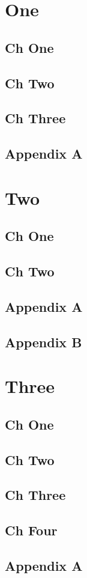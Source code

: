 \documentclass{book}
\begin{document}
    \part{One}
        \chapter{Ch One}
        \chapter{Ch Two}
        \chapter{Ch Three}
      \begin{appendices}
        \chapter{Appendix A}
      \end{appendices}
    \part{Two}
        \chapter{Ch One}
        \chapter{Ch Two}
      \begin{appendices}
        \chapter{Appendix A}
        \chapter{Appendix B}
      \end{appendices}
    \part{Three}
        \chapter{Ch One}
        \chapter{Ch Two}
        \chapter{Ch Three}
        \chapter{Ch Four}
      \begin{appendices}
        \chapter{Appendix A}
      \end{appendices}
\end{document}
